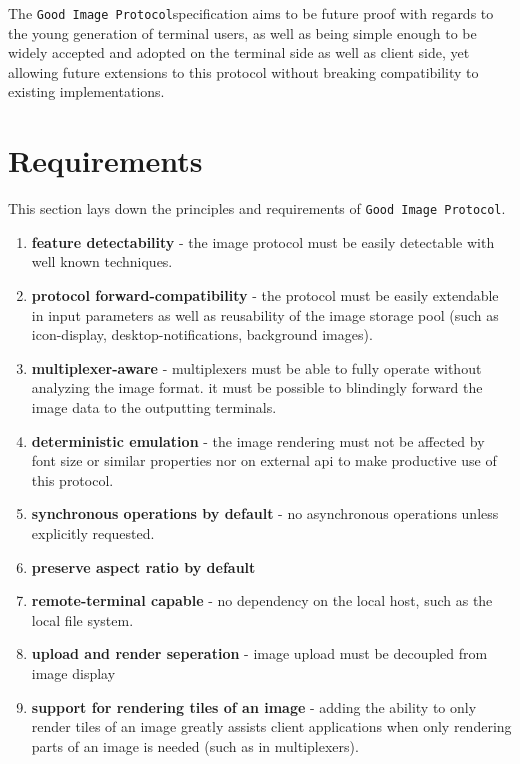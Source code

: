 \documentclass[a4paper]{article}
\newcommand{\code}[1]{\colorbox{light-gray}{\texttt{#1}}}
\newcommand{\GoodImageProtocol}{\code{Good Image Protocol}}
\begin{document}
The \GoodImageProtocol specification aims to be future proof with regards to
the young generation of terminal users, as well as being simple enough
to be widely accepted and adopted on the terminal side as well as client side,
yet allowing future extensions to this protocol
without breaking compatibility to existing implementations.

\section{Requirements} %

This section lays down the principles and requirements of \GoodImageProtocol.

\begin{enumerate}
    \item \textbf{feature detectability} - the image protocol must be easily detectable with well known techniques.
    \item \textbf{protocol forward-compatibility} - the protocol must be easily extendable in input
        parameters as well as reusability of the image storage pool
        (such as icon-display, desktop-notifications, background images).
    \item \textbf{multiplexer-aware} - multiplexers must be able to fully operate without analyzing the image format.
        it must be possible to blindingly forward the image data to the outputting terminals.
    \item \textbf{deterministic emulation} - the image rendering must not be affected by font size
        or similar properties nor on external api to make productive use of this protocol.
    \item \textbf{synchronous operations by default} - no asynchronous operations unless explicitly requested.
    \item \textbf{preserve aspect ratio by default}
    \item \textbf{remote-terminal capable} - no dependency on the local host, such as the local file system.
    \item \textbf{upload and render seperation} - image upload must be decoupled from image display
    \item \textbf{support for rendering tiles of an image} - adding the ability to only render tiles
        of an image greatly assists client applications when only rendering parts of an image is
        needed (such as in multiplexers).
\end{enumerate}
\end{document}
